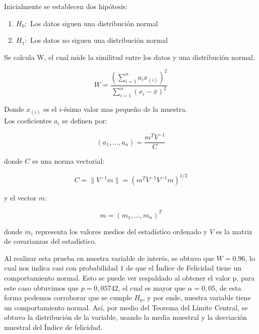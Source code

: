 \begin{theorem} 
    
    Inicialmente se establecen dos hipótesis:

    \begin{enumerate}
        \item $H_0:$ Los datos siguen una distribución normal
        \item $H_1:$ Los datos no siguen una distribución normal
    \end{enumerate}
    
    Se calcula W, el cual mide la similitud entre los datos y una distribución normal.
    
    \begin{equation*}
        W = \frac{\left(\sum_{i=1}^n a_i x_{(i)}\right)^2}{\sum_{i=1}^n (x_i - \bar{x})^2}
    \end{equation*}
    
    Donde $x_{(i)}$ es el $i$-ésimo valor mas pequeño de la muestra. \\
    
    Los coeficientes $a_i$ se definen por:
    
    \begin{equation*}
        (a_1, \ldots, a_n) = \frac{m^T V^{-1}}{C}
    \end{equation*}
    
    donde $C$ es una norma vectorial:

    \begin{equation*}
        C = \| V^{-1} m \| = (m^T V^{-1} V^{-1} m)^{1/2}
    \end{equation*}
        
    y el vector $m$:
    
    \begin{equation*}
        m = (m_1, \ldots, m_n)^T
    \end{equation*}
    
    donde $m_i$ representa los valores medios del estadístico ordenado y $V$ es la matriz de covarianzas del estadístico.
\end{theorem}

Al realizar esta prueba en nuestra variable de interés, se obtuvo que $W = 0.96$, lo cual nos indica casi con probabilidad $1$ de que el Índice de Felicidad tiene un comportamiento normal. Esto se puede ver respaldado al obtener el valor p, para este caso obtuvimos que $p = 0,05742$, el cual es mayor que $\alpha = 0,05$, de esta forma podemos corroborar que se cumple $H_0$, y por ende, nuestra variable tiene un comportamiento normal. Así, por medio del Teorema del Límite Central, se obtuvo la distribución de la variable, usando la media muestral y la desviación muestral del Índice de felicidad.
\pagebreak

